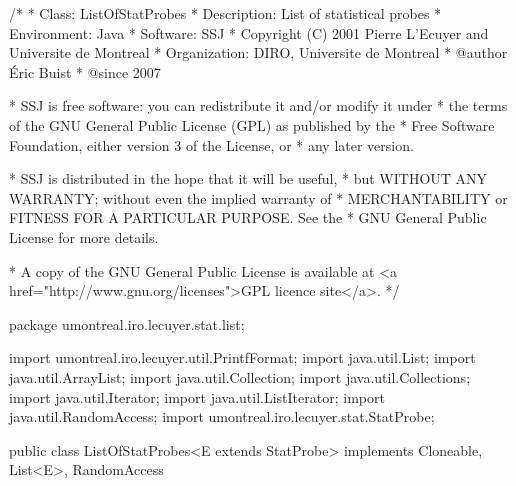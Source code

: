 \begin{code}
\begin{hide}
/*
 * Class:        ListOfStatProbes
 * Description:  List of statistical probes
 * Environment:  Java
 * Software:     SSJ 
 * Copyright (C) 2001  Pierre L'Ecuyer and Universite de Montreal
 * Organization: DIRO, Universite de Montreal
 * @author       Éric Buist 
 * @since        2007

 * SSJ is free software: you can redistribute it and/or modify it under
 * the terms of the GNU General Public License (GPL) as published by the
 * Free Software Foundation, either version 3 of the License, or
 * any later version.

 * SSJ is distributed in the hope that it will be useful,
 * but WITHOUT ANY WARRANTY; without even the implied warranty of
 * MERCHANTABILITY or FITNESS FOR A PARTICULAR PURPOSE.  See the
 * GNU General Public License for more details.

 * A copy of the GNU General Public License is available at
   <a href="http://www.gnu.org/licenses">GPL licence site</a>.
 */
\end{hide}
package umontreal.iro.lecuyer.stat.list;\begin{hide}

import umontreal.iro.lecuyer.util.PrintfFormat;
import java.util.List;
import java.util.ArrayList;
import java.util.Collection;
import java.util.Collections;
import java.util.Iterator;
import java.util.ListIterator;
import java.util.RandomAccess;
import umontreal.iro.lecuyer.stat.StatProbe;
\end{hide}


public class ListOfStatProbes<E extends StatProbe>
                                implements Cloneable, List<E>, RandomAccess\begin{hide} {

   // probes must implement RandomAccess, otherwise this class must not implement RandomAccess.
   private List<E> probes;
   private List<ArrayOfObservationListener> listeners = new ArrayList<ArrayOfObservationListener>();
   protected boolean collect = true;
   protected boolean broadcast = false;
   protected String name;\end{hide}
\end{code}
